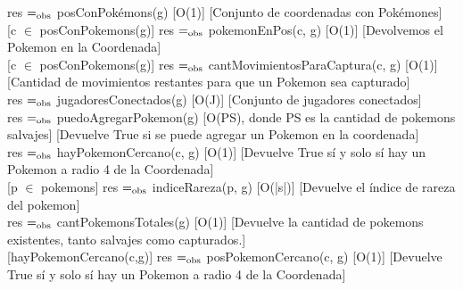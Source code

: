 {res $=_{\mathrm{obs}}$ posConPok\'emons(g)}
[O(1)]
[Conjunto de coordenadas con Pok\'emones]
\\

[c $\in$ posConPokemons(g)]
{res $=_{\mathrm{obs}}$ pokemonEnPos(c, g)}
[O(1)]
[Devolvemos el Pokemon en la Coordenada]
\\

[c $\in$ posConPokemons(g)]
{res $=_{\mathrm{obs}}$ cantMovimientosParaCaptura(c, g)}
[O(1)]
[Cantidad de movimientos restantes para que un Pokemon sea capturado]
\\


{res $=_{\mathrm{obs}}$ jugadoresConectados(g)}
[O(J)]
[Conjunto de jugadores conectados]
\\

{res $=_{\mathrm{obs}}$ puedoAgregarPokemon(g)}
[O(PS), donde PS es la cantidad de pokemons salvajes]
[Devuelve True si se puede agregar un Pokemon en la coordenada]
\\

{res $=_{\mathrm{obs}}$ hayPokemonCercano(c, g)}
[O(1)]
[Devuelve True s\'i y solo s\'i hay un Pokemon a radio 4 de la Coordenada]
\\

[p $\in$ pokemons]
{res $=_{\mathrm{obs}}$ indiceRareza(p, g)}
[O(|s|)]
[Devuelve el índice de rareza del pokemon]
\\

{res $=_{\mathrm{obs}}$ cantPokemonsTotales(g)}
[O(1)]
[Devuelve la cantidad de pokemons existentes, tanto salvajes como capturados.]
\\

[hayPokemonCercano(c,g)]
{res $=_{\mathrm{obs}}$ posPokemonCercano(c, g)}
[O(1)]
[Devuelve True s\'i y solo s\'i hay un Pokemon a radio 4 de la Coordenada]



